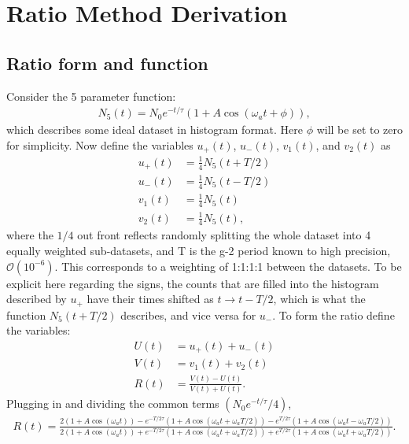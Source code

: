 
\thispagestyle{myheadings}

\chapter{Ratio Method Derivation}
\label{app:RatioDerivation}

\section{Ratio form and function}

Consider the 5 parameter function:
	\begin{align}
		N_{5}(t) = N_{0}e^{-t/\tau}(1 + A \cos(\omega_{a}t + \phi)),
	\end{align}
which describes some ideal dataset in histogram format. Here $\phi$ will be set to zero for simplicity. Now define the variables $u_{+}(t)$, $u_{-}(t)$, $v_{1}(t)$, and $v_{2}(t)$ as
	\begin{equation}
	\begin{aligned}
		u_{+}(t) &= \frac{1}{4} N_{5}(t+T/2) \\
		u_{-}(t) &= \frac{1}{4} N_{5}(t-T/2) \\
		v_{1}(t) &= \frac{1}{4} N_{5}(t) \\
		v_{2}(t) &= \frac{1}{4} N_{5}(t),
	\end{aligned}
	\end{equation}
where the $1/4$ out front reflects randomly splitting the whole dataset into 4 equally weighted sub-datasets, and T is the g-2 period known to high precision, $\mathcal{O}(10^{-6})$. This corresponds to a weighting of 1:1:1:1 between the datasets. To be explicit here regarding the signs, the counts that are filled into the histogram described by $u_{+}$ have their times shifted as $t \rightarrow t - T/2$, which is what the function $N_{5}(t+T/2)$ describes, and vice versa for $u_{-}$. To form the ratio define the variables:
	\begin{equation}
	\begin{aligned}
		U(t) &= u_{+}(t) + u_{-}(t) \\
		V(t) &= v_{1}(t) + v_{2}(t) \\
		R(t) &= \frac{V(t) - U(t)}{V(t) + U(t)}.
	\label{eq:ratio}
	\end{aligned}
	\end{equation}
Plugging in and dividing the common terms $(N_{0}e^{-t/\tau}/4)$,
	\begin{align}
		R(t) = \frac{2(1 + A \cos(\omega_{a}t)) - e^{-T/ 2\tau} (1 + A \cos(\omega_{a}t + \omega_{a}T/2)) - e^{T/ 2\tau} (1 + A \cos(\omega_{a}t - \omega_{a}T/2))} {2(1 + A \cos(\omega_{a}t)) + e^{-T/ 2\tau} (1 + A \cos(\omega_{a}t + \omega_{a}T/2)) + e^{T/ 2\tau} (1 + A \cos(\omega_{a}t + \omega_{a}T/2))}.
	\end{align}

